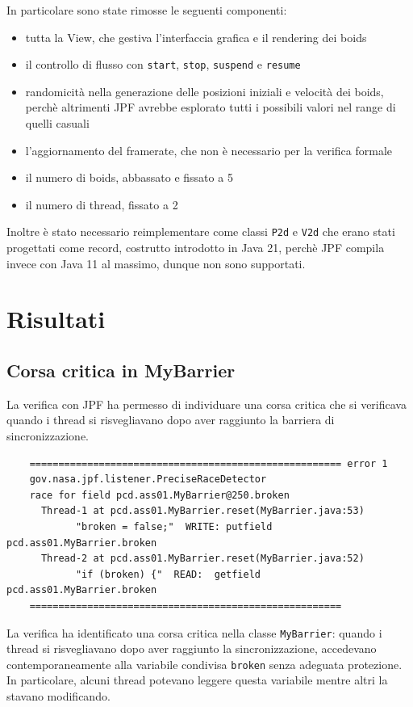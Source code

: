 \documentclass[a4paper,12pt]{report}
\begin{document}
In particolare sono state rimosse le seguenti componenti:
\begin{itemize}
    \item tutta la View, che gestiva l'interfaccia grafica e il rendering dei boids
    \item il controllo di flusso con \texttt{start}, \texttt{stop}, \texttt{suspend} e \texttt{resume} 
    \item randomicità nella generazione delle posizioni iniziali e velocità dei boids, perchè altrimenti JPF avrebbe esplorato tutti i possibili valori nel range di quelli casuali
    \item l'aggiornamento del framerate, che non è necessario per la verifica formale
    \item il numero di boids, abbassato e fissato a 5
    \item il numero di thread, fissato a 2
\end{itemize}

Inoltre è stato necessario reimplementare come classi \texttt{P2d} e \texttt{V2d} che erano stati progettati come record, costrutto introdotto in Java 21, perchè JPF compila invece con Java 11 al massimo, dunque non sono supportati.

\section{Risultati}

\subsection{Corsa critica in MyBarrier}
La verifica con JPF ha permesso di individuare una corsa critica che si verificava quando i thread si risvegliavano dopo aver raggiunto la barriera di sincronizzazione.

\begin{verbatim}
    ====================================================== error 1
    gov.nasa.jpf.listener.PreciseRaceDetector
    race for field pcd.ass01.MyBarrier@250.broken
      Thread-1 at pcd.ass01.MyBarrier.reset(MyBarrier.java:53)
            "broken = false;"  WRITE: putfield pcd.ass01.MyBarrier.broken
      Thread-2 at pcd.ass01.MyBarrier.reset(MyBarrier.java:52)
            "if (broken) {"  READ:  getfield pcd.ass01.MyBarrier.broken
    ====================================================== 
\end{verbatim}

La verifica ha identificato una corsa critica nella classe \texttt{MyBarrier}: quando i thread si risvegliavano dopo aver raggiunto la sincronizzazione, accedevano contemporaneamente alla variabile condivisa \texttt{broken} senza adeguata protezione. In particolare, alcuni thread potevano leggere questa variabile mentre altri la stavano modificando.
\end{document}
